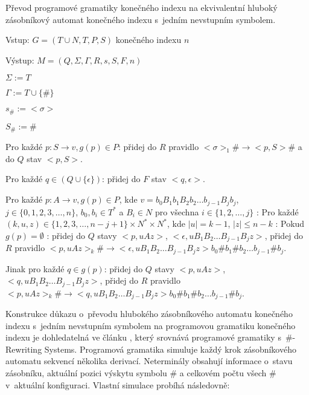 \begin{Alg} \label{alg_PG}
Převod programové gramatiky konečného indexu na ekvivalentní hluboký zásobníkový automat konečného indexu s~jedním nevstupním symbolem.

\begin{list}{}{\setlength\parsep{0cm} \setlength\itemsep{0cm} \setlength\leftmargin{1em}}
  \item Vstup: $G = (T \cup N ,T,P,S)$ konečného indexu $n$
  \item Výstup: $M = (Q,\Sigma,\Gamma, R, s, S , F, n)$ \medskip
  
  \item ${\Sigma} := T$
  \item ${\Gamma} := T \cup \{\#\}$
  \item $s_\# := <\sigma>$
  \item $S_\# := \# $ \medskip

  \item Pro každé $p: S \rightarrow v, g(p) \in P$: 
  \subitem přidej do $R$ pravidlo $<\sigma>_1 \# \rightarrow <p, S> \#$ a do $Q$ stav $<p, S>$. \medskip

  \item Pro každé $q \in (Q \cup \{\epsilon\})$: 
  \subitem přidej do $F$ stav $<q, \epsilon>$. \medskip

  \item Pro každé $p: A \rightarrow v, g(p) \in P$,  kde $v=b_0 B_1 b_1 B_2 b_2 \dots b_{j-1} B_{j} b_j$, $j \in \{0,1,2,3,\dots,n\}$, $b_0,b_i \in T^*$ a $B_i \in N$ pro všechna $i \in \{1,2,\dots,j\}$ : \smallskip
  \subitem Pro každé $(k,u,z) \in \{1,2,3,\dots,n-j+1\} \times N^* \times N^*$, kde $|u| = k-1$, $|z|  \le n-k$ : \medskip
  \subsubitem Pokud $g(p) = \emptyset$ :
  \subsubitem přidej do $Q$ stavy $<p,uAz>$, $<\epsilon, u B_1 B_2 \dots B_{j-1} B_{j} z>$,
  \subsubitem přidej do $R$ pravidlo $<p,uAz>_k \# \rightarrow <\epsilon, u B_1 B_2 \dots B_{j-1} B_{j} z> b_0 \# b_1 \# b_2 \dots b_{j-1} \# b_j$. \medskip

  \subsubitem Jinak pro každé $q \in g(p)$:
  \subsubitem přidej do $Q$ stavy $<p,uAz>$, $<q, u B_1 B_2 \dots B_{j-1} B_{j} z>$,
  \subsubitem přidej do $R$ pravidlo $<p,uAz>_k \# \rightarrow <q, u B_1 B_2 \dots B_{j-1} B_{j} z> b_0 \# b_1 \# b_2 \dots b_{j-1} \# b_j$.

\end{list}
\end{Alg}

Konstrukce důkazu o~převodu hlubokého zásobníkového automatu konečného indexu s~jedním nevstupním symbolem na programovou gramatiku konečného indexu je dohledatelná ve článku \cite{Krivka:RewritingSystems}, který srovnává programové gramatiky s~\#-Rewriting Systems. Programová gramatika simuluje každý krok zásobníkového automatu sekvencí několika derivací. Neterminály obsahují informace o~stavu zásobníku, aktuální pozici výskytu symbolu \# a celkovém počtu všech \# v~aktuální konfiguraci. Vlastní simulace probíhá následovně:

